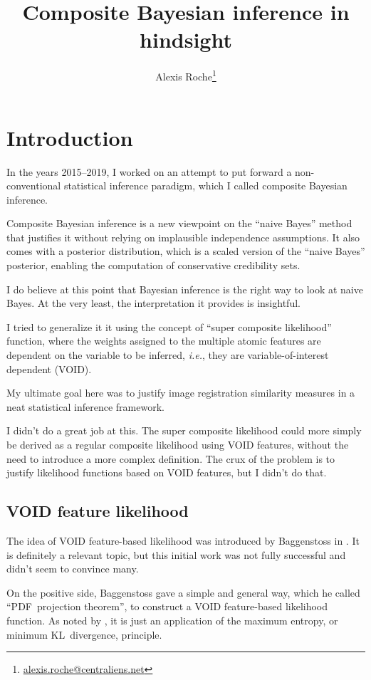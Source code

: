 \documentclass[english]{scrartcl}
\title{Composite Bayesian inference in hindsight}
\author{Alexis Roche\thanks{\url{alexis.roche@centraliens.net}}}
\begin{document}
\maketitle

\section{Introduction}

In the years 2015--2019, I worked on an attempt to put forward a non-conventional statistical inference paradigm, which I called composite Bayesian inference.

Composite Bayesian inference is a new viewpoint on the ``naive Bayes'' method that justifies it without relying on implausible independence assumptions. It also comes with a posterior distribution, which is a scaled version of the ``naive Bayes'' posterior, enabling the computation of conservative credibility sets.

I do believe at this point that Bayesian inference is the right way to look at naive Bayes. At the very least, the interpretation it provides is insightful.

I tried to generalize it it using the concept of ``super composite likelihood'' function, where the weights assigned to the multiple atomic features are dependent on the variable to be inferred, {\em i.e.}, they are variable-of-interest dependent (VOID).

My ultimate goal here was to justify image registration similarity measures in a neat statistical inference framework.

I didn't do a great job at this. The super composite likelihood could more simply be derived as a regular composite likelihood using VOID features, without the need to introduce a more complex definition. The crux of the problem is to justify likelihood functions based on VOID features, but I didn't do that.

\subsection{VOID feature likelihood}

The idea of VOID feature-based likelihood was introduced by Baggenstoss in \cite{Baggenstoss-03}. It is definitely a relevant topic, but this initial work was not fully successful and didn't seem to convince many.

On the positive side, Baggenstoss gave a simple and general way, which he called ``PDF~projection theorem'', to construct a VOID feature-based likelihood function. As noted by \cite{Minka-04}, it is just an application of the maximum entropy, or minimum KL~divergence, principle.
\end{document}
